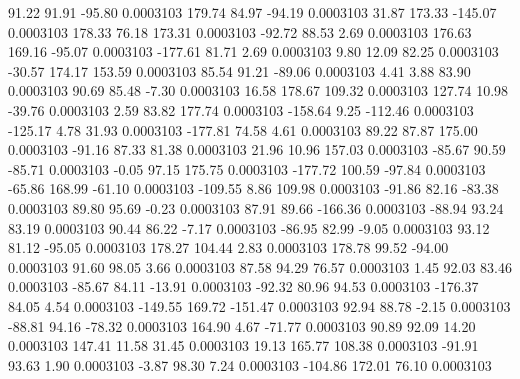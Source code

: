        91.22       91.91      -95.80     0.0003103
      179.74       84.97      -94.19     0.0003103
       31.87      173.33     -145.07     0.0003103
      178.33       76.18      173.31     0.0003103
      -92.72       88.53        2.69     0.0003103
      176.63      169.16      -95.07     0.0003103
     -177.61       81.71        2.69     0.0003103
        9.80       12.09       82.25     0.0003103
      -30.57      174.17      153.59     0.0003103
       85.54       91.21      -89.06     0.0003103
        4.41        3.88       83.90     0.0003103
       90.69       85.48       -7.30     0.0003103
       16.58      178.67      109.32     0.0003103
      127.74       10.98      -39.76     0.0003103
        2.59       83.82      177.74     0.0003103
     -158.64        9.25     -112.46     0.0003103
     -125.17        4.78       31.93     0.0003103
     -177.81       74.58        4.61     0.0003103
       89.22       87.87      175.00     0.0003103
      -91.16       87.33       81.38     0.0003103
       21.96       10.96      157.03     0.0003103
      -85.67       90.59      -85.71     0.0003103
       -0.05       97.15      175.75     0.0003103
     -177.72      100.59      -97.84     0.0003103
      -65.86      168.99      -61.10     0.0003103
     -109.55        8.86      109.98     0.0003103
      -91.86       82.16      -83.38     0.0003103
       89.80       95.69       -0.23     0.0003103
       87.91       89.66     -166.36     0.0003103
      -88.94       93.24       83.19     0.0003103
       90.44       86.22       -7.17     0.0003103
      -86.95       82.99       -9.05     0.0003103
       93.12       81.12      -95.05     0.0003103
      178.27      104.44        2.83     0.0003103
      178.78       99.52      -94.00     0.0003103
       91.60       98.05        3.66     0.0003103
       87.58       94.29       76.57     0.0003103
        1.45       92.03       83.46     0.0003103
      -85.67       84.11      -13.91     0.0003103
      -92.32       80.96       94.53     0.0003103
     -176.37       84.05        4.54     0.0003103
     -149.55      169.72     -151.47     0.0003103
       92.94       88.78       -2.15     0.0003103
      -88.81       94.16      -78.32     0.0003103
      164.90        4.67      -71.77     0.0003103
       90.89       92.09       14.20     0.0003103
      147.41       11.58       31.45     0.0003103
       19.13      165.77      108.38     0.0003103
      -91.91       93.63        1.90     0.0003103
       -3.87       98.30        7.24     0.0003103
     -104.86      172.01       76.10     0.0003103
